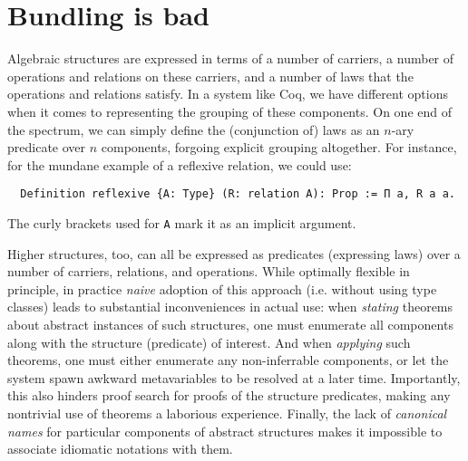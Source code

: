 \documentclass[a4paper,10pt,runningheads]{llncs}
\begin{document}

\section{Bundling is bad}\label{bundling}

Algebraic structures are expressed in terms of a number of carriers, a number of operations and relations on these carriers, and a number of laws that the operations and relations satisfy. In a system like Coq, we have different options when it comes to representing the grouping of these components. On one end of the spectrum, we can simply define the (conjunction of) laws as an $n$-ary predicate over $n$ components, forgoing explicit grouping altogether. For instance, for the mundane example of a reflexive relation, we could use:

\begin{lstlisting}
  Definition reflexive {A: Type} (R: relation A): Prop := Π a, R a a.
\end{lstlisting}
The curly brackets used for \lstinline|A| mark it as an implicit argument.

Higher structures, too, can all be expressed as predicates (expressing laws) over a number of carriers, relations, and operations. While optimally flexible in principle, in practice \emph{naive} adoption of this approach (i.e. without using type classes) leads to substantial inconveniences in actual use: when \emph{stating} theorems about abstract instances of such structures, one must enumerate all components along with the structure (predicate) of interest. And when \emph{applying} such theorems, one must either enumerate any non-inferrable components, or let the system spawn awkward metavariables to be resolved at a later time. Importantly, this also hinders proof search for proofs of the structure predicates, making any nontrivial use of theorems a laborious experience. Finally, the lack of \emph{canonical names} for particular components of abstract structures makes it impossible to associate idiomatic notations with them.

\end{document}
